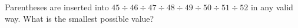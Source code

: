 Parentheses are inserted into $45\div46\div47\div48\div49\div50\div51\div52$ in any valid way. What is the smallest possible value?
